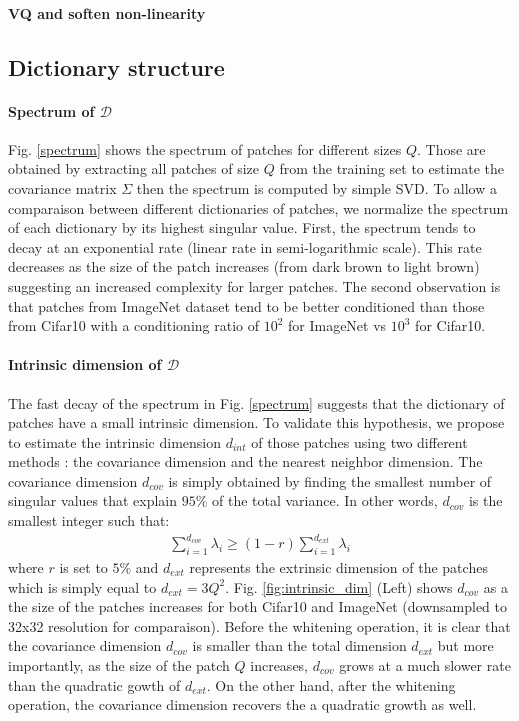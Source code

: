 \documentclass{article}
\begin{document}
{\paragraph{VQ and soften non-linearity}
\subsection{Dictionary structure}
\paragraph{Spectrum of $\mathcal{D}$}
Fig. \ref{spectrum} shows the spectrum of patches for different sizes $Q$. Those are obtained by extracting all patches of size $Q$ from the training set to estimate the  covariance matrix $\Sigma$ then the spectrum is computed by simple SVD. To allow a comparaison between different dictionaries of patches, we normalize the spectrum of each dictionary by its highest singular value. First, the spectrum tends to decay at an exponential rate (linear rate in semi-logarithmic scale). This rate decreases as the size of the patch increases (from dark brown to light brown) suggesting an increased complexity for larger patches. The second observation is that patches from ImageNet dataset tend to be better conditioned than those from Cifar10 with a conditioning ratio of $10^2$ for ImageNet vs $10^3$ for Cifar10.

\paragraph{Intrinsic dimension of $\mathcal{D}$}
The fast decay of the spectrum in Fig. \ref{spectrum} suggests that the dictionary of patches have a small intrinsic dimension. To validate this hypothesis, we propose to estimate the intrinsic dimension $d_{int}$ of those patches using two different methods : the covariance dimension and the nearest neighbor dimension. 
The covariance dimension  $ d_{cov}$ is simply obtained by finding the smallest number of singular values that explain $95\%$ of the total variance. In other words, $d_{cov}$ is the smallest integer such that:
\begin{align}
	 \sum_{i=1}^{d_{cov}} \lambda_i \geq (1-r) \sum_{i=1}^{d_{ext}} \lambda_i
\end{align}
where $r$ is set to $5\%$ and  $d_{ext}$ represents the extrinsic dimension of the patches which is simply equal to $d_{ext} = 3 Q^2$. Fig. \ref{fig:intrinsic_dim} (Left) shows $d_{cov}$ as a the size of the patches increases for both Cifar10 and ImageNet (downsampled to 32x32 resolution for comparaison). Before the whitening operation, it is clear that the covariance dimension $d_{cov}$ is smaller than the total dimension $d_{ext}$ but more importantly, as the size of the patch $Q$  increases, $d_{cov}$ grows at a much slower rate than the quadratic gowth of $d_{ext}$. On the other hand, after the whitening operation, the covariance dimension recovers the a quadratic growth as well.

}
\end{document}
